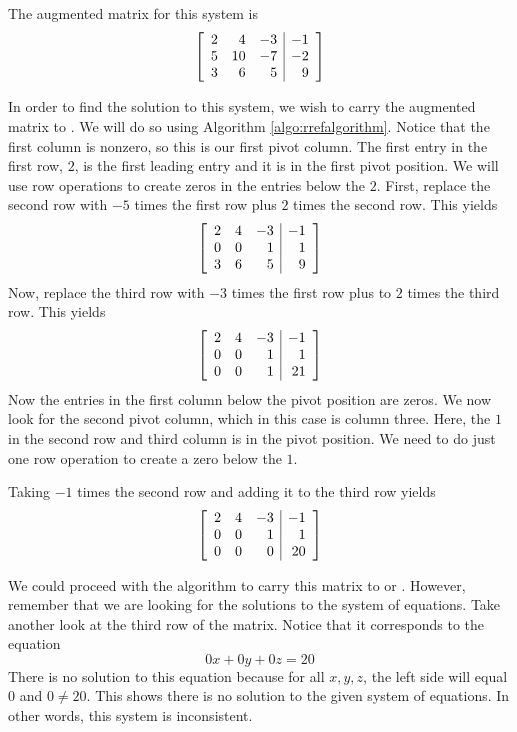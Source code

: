 \begin{solution} The augmented matrix for this system is
\begin{equation*}
\left[
\begin{array}{rrr|r}
2 & 4  & -3 & -1 \\
5 & 10 & -7 & -2 \\
3 & 6  &  5 &  9
\end{array}
\right]
\end{equation*}

In order to find the solution to this system, we wish to carry the augmented matrix to \rref.
We will do so using Algorithm \ref{algo:rrefalgorithm}. Notice that
the first column is nonzero, so this is our first pivot column. The first entry in the first row, $2$, is the
first leading entry and it is in the first pivot position. We will use row operations
to create zeros in the entries below the $2$.  First, replace the second row with $-5$ times the first row plus $2$ times the second row. This yields
\begin{equation*}
\left[
\begin{array}{rrr|r}
2 & 4 & -3 & -1 \\
0 & 0 & 1 & 1 \\
3 & 6 & 5 & 9
\end{array}
\right]
\end{equation*}
Now, replace the third row with $-3$ times the first
row plus to $2$ times the third row. This yields
\begin{equation*}
\left[
\begin{array}{rrr|r}
2 & 4 & -3 &  -1 \\
0 & 0 & 1 & 1 \\
0 & 0 & 1 & 21
\end{array}
\right] 
\end{equation*}
Now the entries in the first column below the pivot position are zeros. We now look for the second pivot column, which in this case is column three. 
Here, the $1$ in the second row and third column is in the pivot position. 
We need to do just one row operation to create a zero below the $1$. 

Taking $-1$ times the second row and
adding it to the third row yields
\begin{equation*}
\left[
\begin{array}{rrr|r}
2 & 4 & -3 & -1 \\
0 & 0 &  1 & 1 \\
0 & 0 &  0 & 20
\end{array}
\right] 
\end{equation*}

We could proceed with the algorithm to carry this matrix to \ef \; or \rref. However, remember that 
we are looking for the solutions to the system of equations. Take another look at the third row of the matrix.
Notice that it corresponds to 
the equation
\begin{equation*}
0x+0y+0z=20
\end{equation*}
There is no solution to this equation because for all $x,y,z$, the left side will equal $0$ and $0\neq 20.$ This shows there is no
solution to the given system of equations. In other words, this system is inconsistent.
\end{solution}

